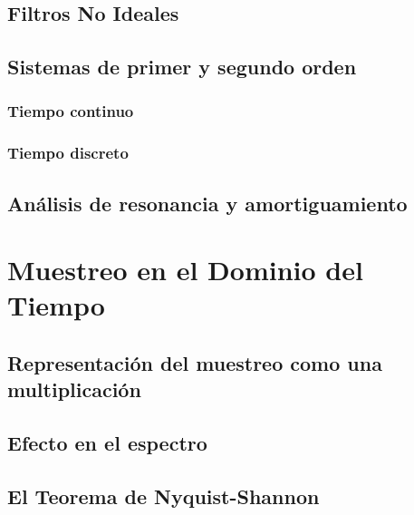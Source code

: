 \documentclass[11pt,a4paper,openany]{book}
\begin{document}
\section{Filtros No Ideales}

\section{Sistemas de primer y segundo orden}

\subsection{Tiempo continuo}

\subsection{Tiempo discreto}

\section{Análisis de resonancia y amortiguamiento}



\chapter{Muestreo en el Dominio del Tiempo}

\section{Representación del muestreo como una multiplicación}

\section{Efecto en el espectro}

\section{El Teorema de Nyquist-Shannon}
\end{document}

